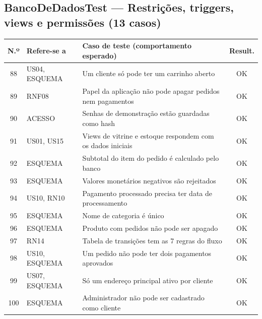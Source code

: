 \subsection*{BancoDeDadosTest --- Restrições, triggers, views e permissões (13 casos)}
\footnotesize
\begin{longtable}{|c|p{2.5cm}|p{8.4cm}|c|}
\hline
\rowcolor{gray!30} \textbf{N.º} & \textbf{Refere-se a} & \textbf{Caso de teste (comportamento esperado)} & \textbf{Result.} \\ \hline
\endhead
88 & US04, ESQUEMA & Um cliente só pode ter um carrinho aberto & \cellcolor{green!20}OK \\ \hline
89 & RNF08 & Papel da aplicação não pode apagar pedidos nem pagamentos & \cellcolor{green!20}OK \\ \hline
90 & ACESSO & Senhas de demonstração estão guardadas como hash & \cellcolor{green!20}OK \\ \hline
91 & US01, US15 & Views de vitrine e estoque respondem com os dados iniciais & \cellcolor{green!20}OK \\ \hline
92 & ESQUEMA & Subtotal do item do pedido é calculado pelo banco & \cellcolor{green!20}OK \\ \hline
93 & ESQUEMA & Valores monetários negativos são rejeitados & \cellcolor{green!20}OK \\ \hline
94 & US10, RN10 & Pagamento processado precisa ter data de processamento & \cellcolor{green!20}OK \\ \hline
95 & ESQUEMA & Nome de categoria é único & \cellcolor{green!20}OK \\ \hline
96 & ESQUEMA & Produto com pedidos não pode ser apagado & \cellcolor{green!20}OK \\ \hline
97 & RN14 & Tabela de transições tem as 7 regras do fluxo & \cellcolor{green!20}OK \\ \hline
98 & US10, ESQUEMA & Um pedido não pode ter dois pagamentos aprovados & \cellcolor{green!20}OK \\ \hline
99 & US07, ESQUEMA & Só um endereço principal ativo por cliente & \cellcolor{green!20}OK \\ \hline
100 & ESQUEMA & Administrador não pode ser cadastrado como cliente & \cellcolor{green!20}OK \\ \hline
\end{longtable}\normalsize
